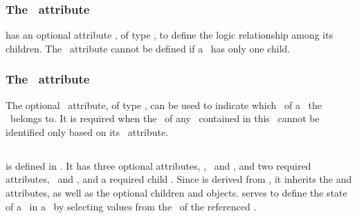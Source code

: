 \subsubsection{The \relationAtt\ attribute}
\label{def:SubListOfSpeciesFeatures:relation}

\SubListOfSpeciesFeatures has an optional attribute \relationAtt, of type \RelationPTWC, to define the logic relationship among its children. The \relationAtt\ attribute cannot be defined if a \subListOfSpeciesFeatures\ has only one child. 

\subsubsection{The \componentAtt\ attribute}
\label{def:SubListOfSpeciesFeatures:component}

The optional \componentAtt\ attribute, of type \SIdRefPT, can be used to indicate which \componentWR\ of a \species\ the \subListOfSpeciesFeatures\ belongs to. It is required when the \component\ of any \speciesFeature\ contained in this \subListOfSpeciesFeatures\ cannot be identified only based on its \speciesFeatureTypeAtt\ attribute.

\subsection{}
\label{def:SpeciesFeature}

 is defined in .  It has three optional attributes, \idAtt, \nameAtt\ and \componentAtt, and two required attributes, \speciesFeatureTypeAtt\ and \occurAtt, and a required child \listOfSpeciesFeatureValues. Since  is derived from , it inherits the  and  attributes, as well as the optional children  and  objects.  serves to define the state of a \component\ in a \species\ by selecting values from the \listOfPossibleSpeciesFeatureValues\ of the referenced \speciesFeatureType. 

